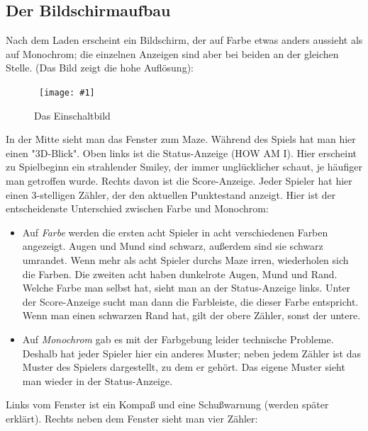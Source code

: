 \documentclass[12pt,twoside]{article}
\makeatletter
\newcommand{\bild}[2]{\begin{figure}[hbtp]%
\center\mbox{%
\texttt{[image: \#1]}%
}\caption{#2}\label{ab@_#1}\end{figure}}
\makeatother
\begin{document}
\subsection{Der Bildschirmaufbau}


Nach dem Laden erscheint ein Bildschirm, der auf Farbe etwas anders aussieht 
als auf Monochrom; die einzelnen Anzeigen sind aber bei beiden an der 
gleichen Stelle. (Das Bild zeigt die hohe Auf\/l\"osung):

\bild{midipic}{Das Einschaltbild}


In der Mitte sieht man das Fenster zum Maze. W\"ahrend des Spiels hat man hier 
einen "3D-Blick". Oben links ist die Status-Anzeige (HOW AM I). Hier 
erscheint zu Spielbeginn ein strahlender Smiley, der immer ungl\"ucklicher 
schaut, je h\"aufiger man getroffen wurde. Rechts davon ist die Score-Anzeige. 
Jeder Spieler hat hier einen 3-stelligen Z\"ahler, der den aktuellen 
Punktestand anzeigt. Hier ist der entscheidenste Unterschied zwischen Farbe 
und Monochrom:


\begin{itemize}

\item Auf {\em Farbe\/} werden die ersten acht Spieler in acht verschiedenen 
Farben angezeigt. Augen und Mund sind schwarz, au\ss{}erdem sind sie schwarz 
umrandet. Wenn mehr als acht Spieler durchs Maze irren, wiederholen sich die 
Farben. Die zweiten acht haben dunkelrote Augen, Mund und Rand. Welche Farbe 
man selbst hat, sieht man an der Status-Anzeige links. Unter der 
Score-Anzeige sucht man dann die Farbleiste, die dieser Farbe entspricht. 
Wenn man einen schwarzen Rand hat, gilt der obere Z\"ahler, sonst der untere.


\item Auf {\em Monochrom\/} gab es mit der Farbgebung leider technische 
Probleme. Deshalb hat jeder Spieler hier ein anderes Muster; neben jedem 
Z\"ahler ist das Muster des Spielers dargestellt, zu dem er geh\"ort. Das eigene 
Muster sieht man wieder in der Status-Anzeige.

\end{itemize}


Links vom Fenster ist ein Kompa\ss{} und eine Schu\ss{}warnung (werden sp\"ater 
erkl\"art). Rechts neben dem Fenster sieht man vier Z\"ahler:
\end{document}
